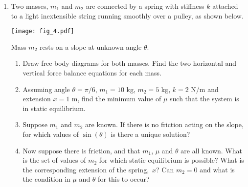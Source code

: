 {\begin{enumerate}
\item Two masses, $m_{1}$ and $m_{2}$ are connected by a spring with stiffness $k$ attached to a light inextensible string running smoothly over a pulley, as shown below.
            \begin{center}
                \texttt{[image: fig\_4.pdf]}
            \end{center}
	    Mass $m_{2}$ rests on a slope at unknown angle $\theta$. 
            \begin{enumerate}
            \item Draw free body diagrams for both masses. Find the two horizontal and vertical force balance equations for each mass.
            \item Assuming angle $\theta = \pi/6$, $m_1 = 10$ kg, $m_2 = 5$ kg, $k = 2$ N/m and extension $x = 1$ m, find the minimum value  of $\mu$ such that the system is in static equilibrium. 
	    \item Suppose $m_{1}$ and $m_{2}$ are known. If there is no friction acting on the slope, for which values of $\sin(\theta)$ is there a unique solution?
	    \item Now suppose there is friction, and that $m_{1}$, $\mu$ and $\theta$ are all known. What is the set of values of $m_{2}$ for which static equilibrium is possible? What is the corresponding extension of the spring,~$x$? Can $m_{2}=0$ and what is the condition in $\mu$ and $\theta$ for this to occur?  
	    \end{enumerate}
 \end{enumerate}
}